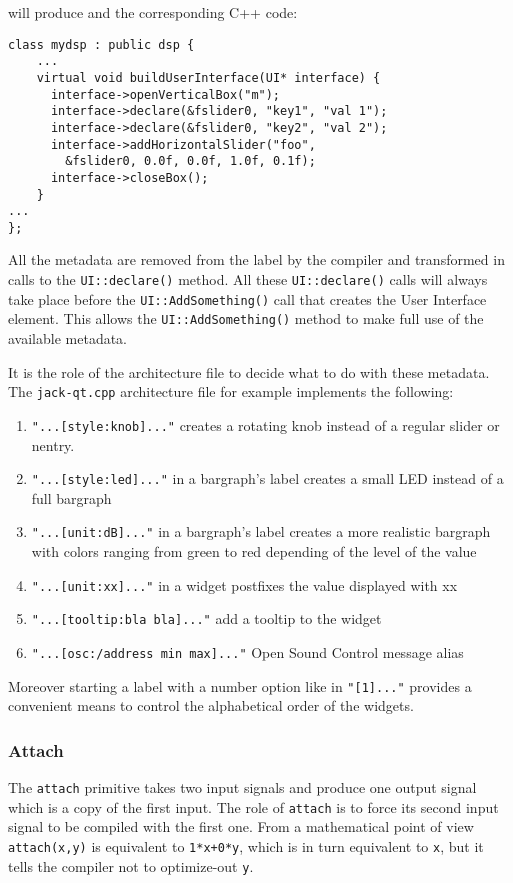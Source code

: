 will produce and the corresponding C++ code:

\begin{lstlisting}
class mydsp : public dsp {
	...
	virtual void buildUserInterface(UI* interface) {
	  interface->openVerticalBox("m");
	  interface->declare(&fslider0, "key1", "val 1");
	  interface->declare(&fslider0, "key2", "val 2");
	  interface->addHorizontalSlider("foo", 
	  	&fslider0, 0.0f, 0.0f, 1.0f, 0.1f);
	  interface->closeBox();
	}
...
};
\end{lstlisting}

All the metadata are removed from the label by the compiler and 
transformed in calls to the \lstinline'UI::declare()' method. All these 
\lstinline'UI::declare()' calls will always take place before the \lstinline'UI::AddSomething()' 
call that creates the User Interface element. This allows the 
\lstinline'UI::AddSomething()'  method to make full use of the available metadata.

It is the role of the architecture file to decide what to do with these 
metadata. The \lstinline'jack-qt.cpp' architecture file for example implements the 
following:
\begin{enumerate}
\item \lstinline'"...[style:knob]..."' creates a rotating knob instead of a regular 
slider or nentry.
\item \lstinline'"...[style:led]..."' in a bargraph's label creates a small LED instead 
of a full bargraph
\item \lstinline'"...[unit:dB]..."' in a bargraph's label creates a more realistic 
bargraph with colors ranging from green to red depending of the level of 
the value
\item \lstinline'"...[unit:xx]..."' in a widget postfixes the value displayed with xx
\item \lstinline'"...[tooltip:bla bla]..."' add a tooltip to the widget
\item \lstinline'"...[osc:/address min max]..."' Open Sound Control message alias
\end{enumerate}

Moreover starting a label with a number option like in \lstinline'"[1]..."' provides
a convenient means to control the alphabetical order of the widgets.

\subsubsection{Attach}
The \lstinline'attach' primitive takes two input signals and produce one output signal which is a copy of the first input. The role of \lstinline'attach' is to force its second input signal to be compiled with the first one. From a mathematical point of view \lstinline'attach(x,y)' is equivalent to \lstinline'1*x+0*y', which is in turn equivalent to \lstinline'x', but it tells the compiler not to optimize-out \lstinline'y'.

